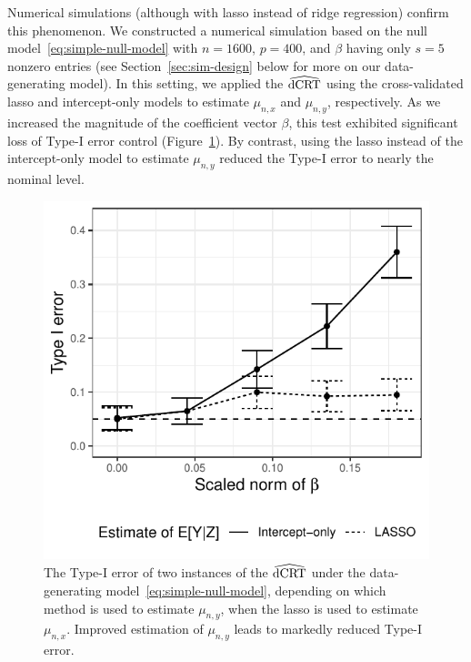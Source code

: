 \documentclass[aos]{imsart}
\theoremstyle{plain}
\theoremstyle{remark}
\newcommand{\dCRThat}{\widehat{\textnormal{dCRT}}}		%
\begin{document}
Numerical simulations (although with lasso instead of ridge regression) confirm this phenomenon. We constructed a numerical simulation based on the null model~\eqref{eq:simple-null-model} with $n = 1600$,  $p = 400$, and $\beta$ having only $s = 5$ nonzero entries (see Section~\ref{sec:sim-design} below for more on our data-generating model). In this setting, we applied the $\dCRThat$ using the cross-validated lasso and intercept-only models to estimate $\mu_{n,x}$ and $\mu_{n,y}$, respectively. As we increased the magnitude of the coefficient vector $\beta$, this test exhibited significant loss of Type-I error control (Figure~\ref{fig:negative_Result}). By contrast, using the lasso instead of the intercept-only model to estimate $\mu_{n,y}$ reduced the Type-I error to nearly the nominal level.
\begin{figure}[!ht]
    \centering
    \includegraphics[scale = 0.85]{figures/negative_result_dCRT.pdf}
    \caption{The Type-I error of two instances of the $\dCRThat$ under the data-generating model~\eqref{eq:simple-null-model}, depending on which method is used to estimate $\mu_{n,y}$, when the lasso is used to estimate $\mu_{n,x}$. Improved estimation of $\mu_{n,y}$ leads to markedly reduced Type-I error.}
    \label{fig:negative_Result}
\end{figure}
\end{document}
